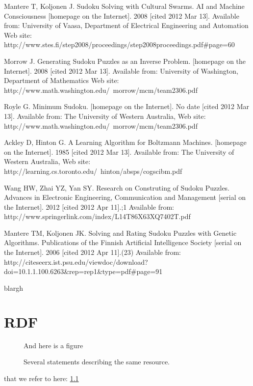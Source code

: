 \documentclass[a4paper,11pt]{kth-mag}
\begin{document}
\begin{thebibliography}{99}
Mantere T, Koljonen J. Sudoku Solving with Cultural Swarms. AI and Machine Consciousness [homepage on the Internet]. 2008 [cited 2012 Mar 13]. Available from: University of Vaasa, Department of Electrical Engineering and Automation Web site: http://www.stes.fi/step2008/proceedings/step2008proceedings.pdf\#page=60

Morrow J. Generating Sudoku Puzzles as an Inverse Problem. [homepage on the Internet]. 2008 [cited 2012 Mar 13]. Available from: University of Washington, Department of Mathematics Web site: http://www.math.washington.edu/~morrow/mcm/team2306.pdf

Royle G. Minimum Sudoku. [homepage on the Internet]. No date [cited 2012 Mar 13]. Available from: The University of Western Australia, Web site: http://www.math.washington.edu/~morrow/mcm/team2306.pdf

Ackley D, Hinton G. A Learning Algorithm for Boltzmann Machines. [homepage on the Internet]. 1985 [cited 2012 Mar 13]. Available from: The University of Western Australia, Web site: http://learning.cs.toronto.edu/~hinton/absps/cogscibm.pdf

Wang HW, Zhai YZ, Yan SY. Research on Construting of Sudoku Puzzles. Advances in Electronic Engineering, Communication and Management [serial on the Internet]. 2012 [cited 2012 Apr 11].;1 Available from: http://www.springerlink.com/index/L14T86X63XQ7402T.pdf

Mantere TM, Koljonen JK. Solving and Rating Sudoku Puzzles with Genetic Algorithms. Publications of the Finnish Artificial Intelligence Society [serial on the Internet]. 2006 [cited 2012 Apr 11].(23) Available from: http://citeseerx.ist.psu.edu/viewdoc/download?doi=10.1.1.100.6263\&rep=rep1\&type=pdf\#page=91

blargh
\end{thebibliography}

\appendix
\addappheadtotoc
\chapter{RDF}\label{appA}

\begin{figure}[ht]
\begin{center}
And here is a figure
\caption{\small{Several statements describing the same resource.}}\label{RDF_4}
\end{center}
\end{figure}

that we refer to here: \ref{RDF_4}
\end{document}
